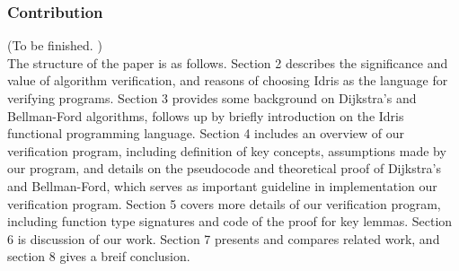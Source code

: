 \documentclass[11pt, a4paper]{article} %
\theoremstyle{definition}
\begin{document}
\subsubsection*{Contribution}
(To be finished. )
\\

The structure of the paper is as follows. Section 2 describes the significance and value of algorithm verification, and reasons of choosing Idris as the language for verifying programs. Section 3 provides some background on Dijkstra's and Bellman-Ford algorithms, follows up by briefly introduction on the Idris functional programming language. Section 4 includes an overview of our verification program, including definition of key concepts, assumptions made by our program, and details on the pseudocode and theoretical proof of Dijkstra's and Bellman-Ford, which serves as important guideline in implementation our verification program. Section 5 covers more details of our verification program, including function type signatures and code of the proof for key lemmas. Section 6 is discussion of our work. Section 7 presents and compares related work, and section 8 gives a breif conclusion.  


\end{document}
